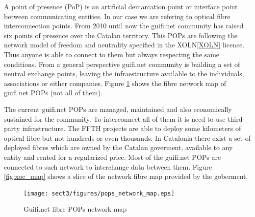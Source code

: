 A point of presence (PoP) is an artificial demarcation point or interface point between communicating entities.
In our case we are refering to optical fibre interconnection points.
From 2010 until now the guifi.net community has raised six points of presence over the Catalan territory.
This POPs are following the network model of freedom and neutrality specified in the XOLN\ref{XOLN} licence.
Thus anyone is able to connect to them but always respecting the same conditions.
From a general perspective guifi.net community is building a set of neutral exchange points, leaving the
infraestructure available to the individuals, associations or either companies.
\medskip
Figure \ref{fig:fibre_map} shows the fibre network map of guifi.net POPs (not all of them).

\bigskip

The current guifi.net POPs are managed, maintained and also economically sustained for the community. 
To interconnect all of them it is need to use third party infrastructure. The FFTH projects are able to deploy some kilometers
of optical fibre but not hundreds or even thousands.
\newline
In Catalonia there exist a set of deployed fibres which are owned by the Catalan goverment, available to any entity and 
rented for a regularized price. Most of the guifi.net POPs are connected to such network to interchange data
between them. Figure \ref{fig:xoc_map} shows a slice of the network fibre map provided by the goberment. 

\begin{figure}[htbp]
  \centering
  \texttt{[image: sect3/figures/pops\_network\_map.eps]} 
  \caption{Guifi.net fibre POPs network map}
  \label{fig:fibre_map}
\end{figure}


